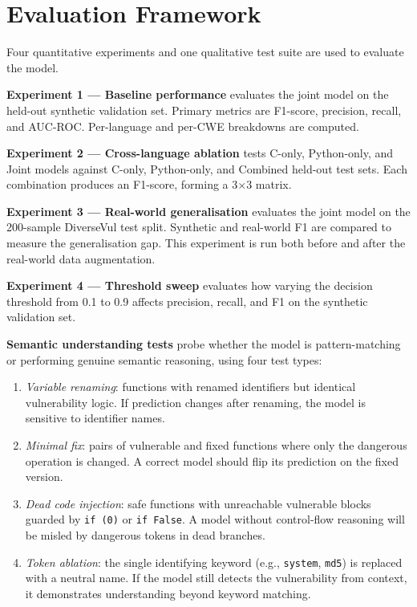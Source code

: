\section{Evaluation Framework}

Four quantitative experiments and one qualitative test suite are used to evaluate the model.

\textbf{Experiment 1 --- Baseline performance} evaluates the joint model on the held-out
synthetic validation set.
Primary metrics are F1-score, precision, recall, and AUC-ROC.
Per-language and per-CWE breakdowns are computed.

\textbf{Experiment 2 --- Cross-language ablation} tests C-only, Python-only, and Joint
models against C-only, Python-only, and Combined held-out test sets.
Each combination produces an F1-score, forming a 3$\times$3 matrix.

\textbf{Experiment 3 --- Real-world generalisation} evaluates the joint model on the
200-sample DiverseVul test split.
Synthetic and real-world F1 are compared to measure the generalisation gap.
This experiment is run both before and after the real-world data augmentation.

\textbf{Experiment 4 --- Threshold sweep} evaluates how varying the decision threshold from
0.1 to 0.9 affects precision, recall, and F1 on the synthetic validation set.

\textbf{Semantic understanding tests} probe whether the model is pattern-matching or
performing genuine semantic reasoning, using four test types:

\begin{enumerate}
  \item \emph{Variable renaming}: functions with renamed identifiers but identical vulnerability
        logic. If prediction changes after renaming, the model is sensitive to identifier names.
  \item \emph{Minimal fix}: pairs of vulnerable and fixed functions where only the dangerous
        operation is changed. A correct model should flip its prediction on the fixed version.
  \item \emph{Dead code injection}: safe functions with unreachable vulnerable blocks guarded
        by \texttt{if (0)} or \texttt{if False}. A model without control-flow reasoning will
        be misled by dangerous tokens in dead branches.
  \item \emph{Token ablation}: the single identifying keyword (e.g., \texttt{system},
        \texttt{md5}) is replaced with a neutral name. If the model still detects the
        vulnerability from context, it demonstrates understanding beyond keyword matching.
\end{enumerate}

